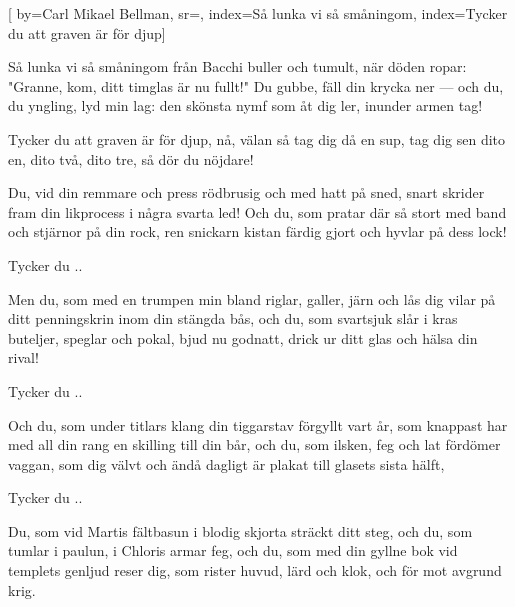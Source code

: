 

[ 		%
	by={Carl Mikael Bellman},					%
	sr={},					%
	index={Så lunka vi så småningom}, %
	index={Tycker du att graven är för djup}]						%
	
\beginverse*						%
Så lunka vi så småningom
från Bacchi buller och tumult,
när döden ropar: "Granne, kom,
ditt timglas är nu fullt!"
Du gubbe, fäll din krycka ner —
och du, du yngling, lyd min lag:
den skönsta nymf som åt dig ler,
inunder armen tag!
\endverse							%

\beginchorus						%
Tycker du att graven är för djup,
nå, välan så tag dig då en sup,
tag dig sen dito en, dito två, dito tre,
så dör du nöjdare!
\endchorus							%

\beginverse*
Du, vid din remmare och press
rödbrusig och med hatt på sned,
snart skrider fram din likprocess
i några svarta led!
Och du, som pratar där så stort
med band och stjärnor på din rock,
ren snickarn kistan färdig gjort
och hyvlar på dess lock!
\endverse

\beginchorus						%
Tycker du ..
\endchorus							%

\beginverse*
Men du, som med en trumpen min
bland riglar, galler, järn och lås
dig vilar på ditt penningskrin
inom din stängda bås,
och du, som svartsjuk slår i kras
buteljer, speglar och pokal,
bjud nu godnatt, drick ur ditt glas
och hälsa din rival!
\endverse

\beginchorus						%
Tycker du ..
\endchorus

\beginverse*
Och du, som under titlars klang
din tiggarstav förgyllt vart år,
som knappast har med all din rang
en skilling till din bår,
och du, som ilsken, feg och lat
fördömer vaggan, som dig välvt
och ändå dagligt är plakat
till glasets sista hälft,
\endverse

\beginchorus						%
Tycker du ..
\endchorus

\beginverse*
Du, som vid Martis fältbasun
i blodig skjorta sträckt ditt steg,
och du, som tumlar i paulun,
i Chloris armar feg,
och du, som med din gyllne bok
vid templets genljud reser dig,
som rister huvud, lärd och klok,
och för mot avgrund krig.
\endverse

